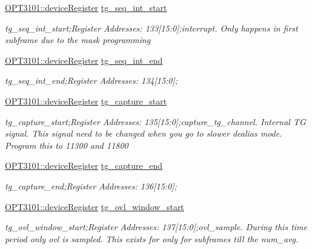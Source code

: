 \begin{DoxyCompactItemize}
\mbox{\hyperlink{class_o_p_t3101_1_1device_register}{O\+P\+T3101\+::device\+Register}} \mbox{\hyperlink{class_o_p_t3101_1_1registers_a0a60b0f7f4db214f884dd21be76e47d1}{tg\+\_\+seq\+\_\+int\+\_\+start}}
\begin{DoxyCompactList}\small\item\em tg\+\_\+seq\+\_\+int\+\_\+start;Register Addresses\+: 133\mbox{[}15\+:0\mbox{]};interrupt. Only happens in first subframe due to the mask programming \end{DoxyCompactList}\item 
\mbox{\hyperlink{class_o_p_t3101_1_1device_register}{O\+P\+T3101\+::device\+Register}} \mbox{\hyperlink{class_o_p_t3101_1_1registers_a5d64a1d13384ed3b40bab6024a15bb75}{tg\+\_\+seq\+\_\+int\+\_\+end}}
\begin{DoxyCompactList}\small\item\em tg\+\_\+seq\+\_\+int\+\_\+end;Register Addresses\+: 134\mbox{[}15\+:0\mbox{]}; \end{DoxyCompactList}\item 
\mbox{\hyperlink{class_o_p_t3101_1_1device_register}{O\+P\+T3101\+::device\+Register}} \mbox{\hyperlink{class_o_p_t3101_1_1registers_a54a3244c947bb01cc57e706cd81ec0e2}{tg\+\_\+capture\+\_\+start}}
\begin{DoxyCompactList}\small\item\em tg\+\_\+capture\+\_\+start;Register Addresses\+: 135\mbox{[}15\+:0\mbox{]};capture\+\_\+tg\+\_\+channel. Internal TG signal. This signal need to be changed when you go to slower dealias mode. Program this to 11300 and 11800 \end{DoxyCompactList}\item 
\mbox{\hyperlink{class_o_p_t3101_1_1device_register}{O\+P\+T3101\+::device\+Register}} \mbox{\hyperlink{class_o_p_t3101_1_1registers_a61bb2d508902da5f6189058aaa7a21d5}{tg\+\_\+capture\+\_\+end}}
\begin{DoxyCompactList}\small\item\em tg\+\_\+capture\+\_\+end;Register Addresses\+: 136\mbox{[}15\+:0\mbox{]}; \end{DoxyCompactList}\item 
\mbox{\hyperlink{class_o_p_t3101_1_1device_register}{O\+P\+T3101\+::device\+Register}} \mbox{\hyperlink{class_o_p_t3101_1_1registers_a0bb0bde768833ea431ed687d71f7b7cf}{tg\+\_\+ovl\+\_\+window\+\_\+start}}
\begin{DoxyCompactList}\small\item\em tg\+\_\+ovl\+\_\+window\+\_\+start;Register Addresses\+: 137\mbox{[}15\+:0\mbox{]};ovl\+\_\+sample. During this time period only ovl is sampled. This exists for only for subframes till the num\+\_\+avg. \end{DoxyCompactList}\item 

\end{DoxyCompactItemize}
